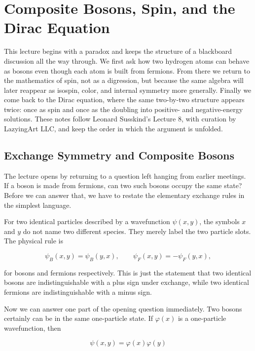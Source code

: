 \chapter{Composite Bosons, Spin, and the Dirac Equation}

This lecture begins with a paradox and keeps the structure of a blackboard discussion all the way through. We first ask how two hydrogen atoms can behave as bosons even though each atom is built from fermions. From there we return to the mathematics of spin, not as a digression, but because the same algebra will later reappear as isospin, color, and internal symmetry more generally. Finally we come back to the Dirac equation, where the same two-by-two structure appears twice: once as spin and once as the doubling into positive- and negative-energy solutions. These notes follow Leonard Susskind's Lecture 8, with curation by LazyingArt LLC, and keep the order in which the argument is unfolded.

\section{Exchange Symmetry and Composite Bosons}

The lecture opens by returning to a question left hanging from earlier meetings. If a boson is made from fermions, can two such bosons occupy the same state? Before we can answer that, we have to restate the elementary exchange rules in the simplest language.

For two identical particles described by a wavefunction \(\psi(x,y)\), the symbols \(x\) and \(y\) do not name two different species. They merely label the two particle slots. The physical rule is

\begin{equation}
\psi_B(x,y)=\psi_B(y,x), \qquad \psi_F(x,y)=-\psi_F(y,x),
\end{equation}

for bosons and fermions respectively. This is just the statement that two identical bosons are indistinguishable with a plus sign under exchange, while two identical fermions are indistinguishable with a minus sign.

Now we can answer one part of the opening question immediately. Two bosons certainly can be in the same one-particle state. If \(\varphi(x)\) is a one-particle wavefunction, then

\begin{equation}
\psi(x,y)=\varphi(x)\varphi(y)
\end{equation}

